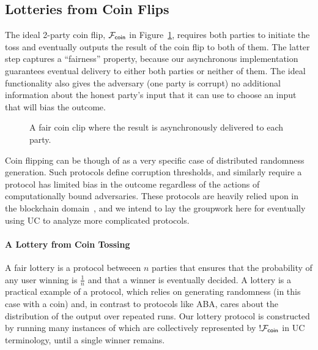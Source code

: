 \subsection{Lotteries from Coin Flips}
The ideal 2-party coin flip, $\mathcal{F}_{{\mathsf {coin}}}$ in Figure~\ref{fig:fcoin}, requires
both parties to initiate the toss and eventually outputs the result of the coin
flip to both of them.  The latter step captures a ``fairness'' property,
because our asynchronous implementation guarantees eventual delivery to either
both parties or neither of them.  The ideal functionality also gives the
adversary (one party is corrupt) no additional information about the honest
party's input that it can use to choose an input that will bias the outcome.

\begin{figure}
\centering

\caption{A fair coin clip where the result is asynchronously delivered to each party.}
\label{fig:fcoin}
\end{figure}

Coin flipping can be though of as a very specific case of distributed
randomness generation.  Such protocols define corruption thresholds, and
similarly require a protocol has limited bias in the outcome regardless of the
actions of computationally bound adversaries.  These protocols are heavily
relied upon in the blockchain domain~\cite{ran, dao}, and we intend to lay the
groupwork here for eventually using UC to analyze more complicated protocols.


\paragraph{A Lottery from Coin Tossing}
A fair lottery is a protocol betweeen $n$ parties that ensures that the
probability of any user winning is $\frac{1}{n}$ and that a winner is
eventually decided. A lottery is a practical example of a protocol, which
relies on generating randomness (in this case with a coin) and, in contrast to
protocols like ABA, cares about the distribution of the output over repeated
runs.  Our lottery protocol is constructed by running many instances of \Fcoin
which are collectively represented by $!\mathcal{F}_{{\mathsf {coin}}}$ in UC terminology, until a
single winner remains.


